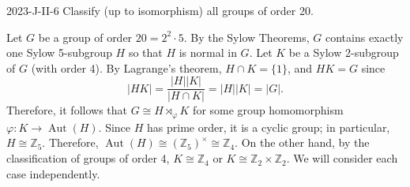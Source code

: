 \documentclass{article}
\begin{document}
	\begin{prb}{2023-J-II-6}
		Classify (up to isomorphism) all groups of order 20. 
	\end{prb}
	Let $G$ be a group of order $20 = 2^{2} \cdot 5$. By the Sylow Theorems, $G$ contains exactly one Sylow 5-subgroup $H$ so that $H$ is normal in $G$. Let $K$ be a Sylow 2-subgroup of $G$ (with order 4). By Lagrange's theorem, $H \cap K = \{1\}$, and $HK = G$ since $$|HK| = \frac{|H||K|}{|H \cap K|} = |H||K| = |G|.$$ Therefore, it follows that $G \cong H \rtimes_{\varphi} K$ for some group homomorphism $\varphi: K \to\operatorname{Aut}(H)$. Since $H$ has prime order, it is a cyclic group; in particular, $H \cong \mathbb{Z}_{5}$. Therefore, $\operatorname{Aut}(H) \cong (\mathbb{Z}_{5})^{\times} \cong \mathbb{Z}_{4}$. On the other hand, by the classification of groups of order 4, $K \cong \mathbb{Z}_{4}$ or $K \cong \mathbb{Z}_{2} \times \mathbb{Z}_{2}$. We will consider each case independently. 
	
\end{document}
